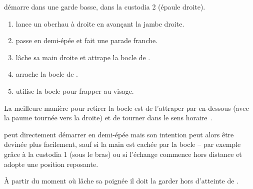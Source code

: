 \begin{technique}[Liegniczer 6]

\A démarre dans une garde basse, \D dans la custodia 2 (épaule droite).

\begin{enumerate}
	\item \D lance un oberhau à droite en avançant la jambe droite.
	
	\item \A passe en demi-épée et fait une parade franche.
	
	\item \A lâche sa main droite et attrape la bocle de \D.
	
	\item \A arrache la bocle de \D.
	
	\item \A utilise la bocle pour frapper \D au visage.
\end{enumerate}

La meilleure manière pour retirer la bocle est de l'attraper par en-dessous (avec la paume tournée vers la droite) et de tourner dans le sens horaire~\footnotemark{}.

\A peut directement démarrer en demi-épée mais son intention peut alors être devinée plus facilement, sauf si la main est cachée par la bocle – par exemple grâce à la custodia 1 (sous le bras) ou si l'échange commence hors distance et \A adopte une position reposante.

À partir du moment où \A lâche sa poignée il doit la garder hors d'atteinte de \D.

\end{technique}

